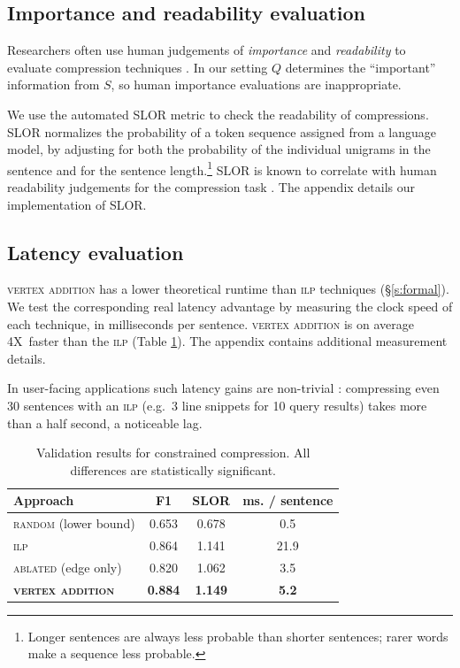 \documentclass[11pt,a4paper]{article}
\newcommand{\speedup}[0]{4X~}
\begin{document}
\subsection{Importance and readability evaluation}\label{s:readabilityinformativeness}

Researchers often use human judgements of \textit{importance} and \textit{readability} to evaluate compression techniques \cite{Knight2000StatisticsBasedS,filippova2015sentence}. In our setting $Q$ determines the ``important'' information from $S$, so human importance evaluations are inappropriate.

We use the automated SLOR metric \cite{lau2015unsupervised} to check the readability of compressions. SLOR normalizes the probability of a token sequence assigned from a language model, by adjusting for both the probability of the individual unigrams in the sentence and for the sentence length.\footnote{Longer sentences are always less probable than shorter sentences; rarer words make a sequence less probable.} SLOR is known to correlate with human readability judgements for the compression task \cite{kannConl}. The appendix details our implementation of SLOR. 

\subsection{Latency evaluation}\label{s:costs}

\textsc{vertex addition} has a lower theoretical runtime than \textsc{ilp} techniques (\S\ref{s:formal}). We test the corresponding real latency advantage by measuring the clock speed of each technique, in milliseconds per sentence. \textsc{vertex addition} is on average \speedup faster than the \textsc{ilp} (Table \ref{t:results}). The appendix contains additional measurement details.

In user-facing applications such latency gains are non-trivial \cite{Nielsen,heerschei,Liu2014TheEO}: compressing even 30 sentences with an \textsc{ilp} (e.g.\ 3 line snippets for 10 query results) takes more than a half second, a noticeable lag. %

\begin{table}[]
\begin{tabular}{lccc}
\centering
Approach & F1 & SLOR &  ms. / sentence  \\ \hline
\textsc{random} {\small (lower bound) }&{\small 0.653}&{\small 0.678}&{\small 0.5}\\
\textsc{ilp}&{\small 0.864}&{\small 1.141}&{\small 21.9}\\
\textsc{ablated} {\small (edge only) }&{\small 0.820}&{\small 1.062}&{\small 3.5}\\
\textbf{\textsc{vertex addition}}&\textbf{\small 0.884}&\textbf{\small 1.149}&\textbf{\small 5.2}\\
\end{tabular}
\caption{Validation results for constrained compression. All differences are statistically significant.}
\label{t:results}
\end{table}
\end{document}
